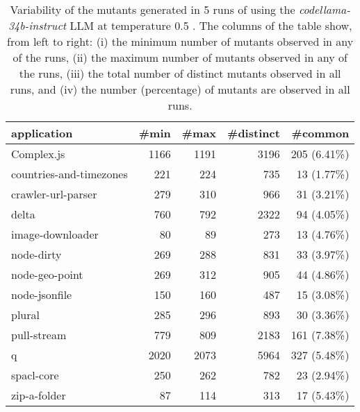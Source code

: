 
\begin{table}[hbt!]
\centering
{\footnotesize
\begin{tabular}{l|r|r|r|r}

{\bf application}  & {\bf \#min} &  {\bf \#max} &  {\bf \#distinct} & {\bf \#common}\\
\hline
Complex.js & 1166 & 1191 & 3196 & 205 (6.41\%) \\ 
countries-and-timezones & 221 & 224 & 735 & 13 (1.77\%) \\ 
crawler-url-parser & 279 & 310 & 966 & 31 (3.21\%) \\ 
delta & 760 & 792 & 2322 & 94 (4.05\%) \\ 
image-downloader & 80 & 89 & 273 & 13 (4.76\%) \\ 
node-dirty & 269 & 288 & 831 & 33 (3.97\%) \\ 
node-geo-point & 269 & 312 & 905 & 44 (4.86\%) \\ 
node-jsonfile & 150 & 160 & 487 & 15 (3.08\%) \\ 
plural & 285 & 296 & 893 & 30 (3.36\%) \\ 
pull-stream & 779 & 809 & 2183 & 161 (7.38\%) \\ 
q & 2020 & 2073 & 5964 & 327 (5.48\%) \\ 
spacl-core & 250 & 262 & 782 & 23 (2.94\%) \\ 
zip-a-folder & 87 & 114 & 313 & 17 (5.43\%) \\ 
\end{tabular}
}
\caption{
  Variability of the mutants generated in 5 runs of \ToolName using the \textit{codellama-34b-instruct} LLM
       at temperature 0.5 . The columns of the table show, from left to right:
    (i) the minimum number of mutants observed in any of the runs,
    (ii) the maximum number of mutants observed in any of the runs,
    (iii) the total number of distinct mutants observed in all runs, and
    (iv) the number (percentage) of mutants are observed in all runs.
}
\label{table:Variability_codellama-34b-instruct_0.5}
\end{table}